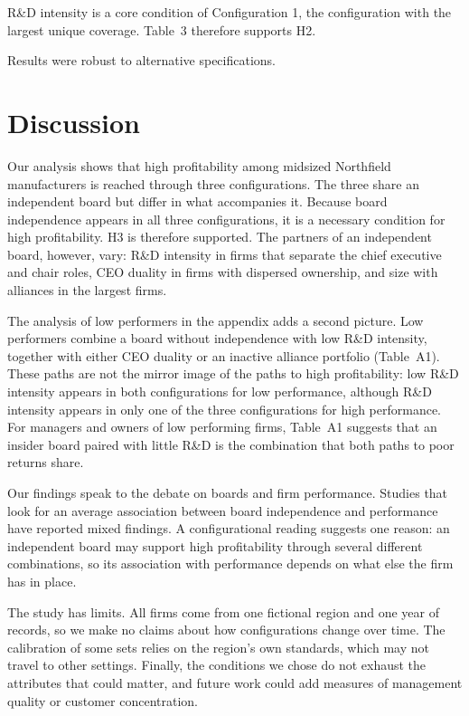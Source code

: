\documentclass[11pt]{article}
\begin{document}
R\&D intensity is a core condition of Configuration 1, the configuration with the largest unique coverage. Table~3 therefore supports H2.

Results were robust to alternative specifications.

\clearpage
\section{Discussion}

Our analysis shows that high profitability among midsized Northfield manufacturers is reached through three configurations. The three share an independent board but differ in what accompanies it. Because board independence appears in all three configurations, it is a necessary condition for high profitability. H3 is therefore supported. The partners of an independent board, however, vary: R\&D intensity in firms that separate the chief executive and chair roles, CEO duality in firms with dispersed ownership, and size with alliances in the largest firms.

The analysis of low performers in the appendix adds a second picture. Low performers combine a board without independence with low R\&D intensity, together with either CEO duality or an inactive alliance portfolio (Table~A1). These paths are not the mirror image of the paths to high profitability: low R\&D intensity appears in both configurations for low performance, although R\&D intensity appears in only one of the three configurations for high performance. For managers and owners of low performing firms, Table~A1 suggests that an insider board paired with little R\&D is the combination that both paths to poor returns share.

Our findings speak to the debate on boards and firm performance. Studies that look for an average association between board independence and performance have reported mixed findings. A configurational reading suggests one reason: an independent board may support high profitability through several different combinations, so its association with performance depends on what else the firm has in place.

The study has limits. All firms come from one fictional region and one year of records, so we make no claims about how configurations change over time. The calibration of some sets relies on the region's own standards, which may not travel to other settings. Finally, the conditions we chose do not exhaust the attributes that could matter, and future work could add measures of management quality or customer concentration.
\end{document}
